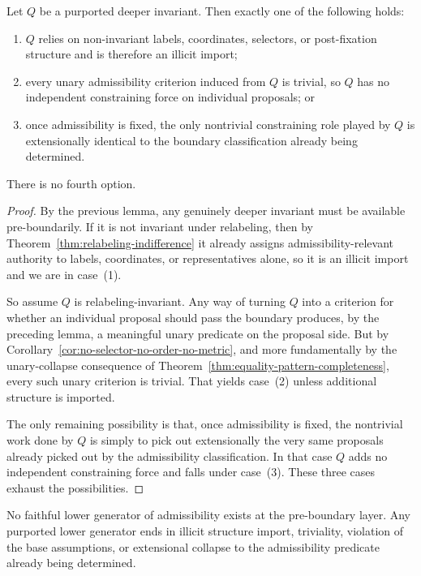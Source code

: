 \begin{theorem}
\label{thm:no-deeper-invariant}
Let $Q$ be a purported deeper invariant. Then exactly one of the following holds:
\begin{enumerate}
  \item $Q$ relies on non-invariant labels, coordinates, selectors, or post-fixation structure and is therefore an illicit import;
  \item every unary admissibility criterion induced from $Q$ is trivial, so $Q$ has no independent constraining force on individual proposals; or
  \item once admissibility is fixed, the only nontrivial constraining role played by $Q$ is extensionally identical to the boundary classification already being determined.
\end{enumerate}
There is no fourth option.
\end{theorem}

\begin{proof}
By the previous lemma, any genuinely deeper invariant must be available pre-boundarily. If it is not invariant under relabeling, then by Theorem~\ref{thm:relabeling-indifference} it already assigns admissibility-relevant authority to labels, coordinates, or representatives alone, so it is an illicit import and we are in case~(1).

So assume $Q$ is relabeling-invariant. Any way of turning $Q$ into a criterion for whether an individual proposal should pass the boundary produces, by the preceding lemma, a meaningful unary predicate on the proposal side. But by Corollary~\ref{cor:no-selector-no-order-no-metric}, and more fundamentally by the unary-collapse consequence of Theorem~\ref{thm:equality-pattern-completeness}, every such unary criterion is trivial. That yields case~(2) unless additional structure is imported.

The only remaining possibility is that, once admissibility is fixed, the nontrivial work done by $Q$ is simply to pick out extensionally the very same proposals already picked out by the admissibility classification. In that case $Q$ adds no independent constraining force and falls under case~(3). These three cases exhaust the possibilities.\cite{MaleyAMetric,MaleyNecessity}
\end{proof}

\begin{theorem}
\label{thm:no-faithful-lower-generator-preboundary}
No faithful lower generator of admissibility exists at the pre-boundary layer. Any purported lower generator ends in illicit structure import, triviality, violation of the base assumptions, or extensional collapse to the admissibility predicate already being determined.
\end{theorem}

